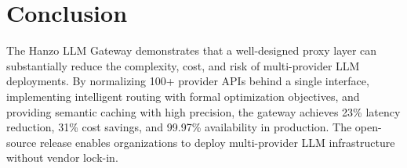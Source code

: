 \section{Conclusion}

\label{sec:conclusion}

The Hanzo LLM Gateway demonstrates that a well-designed proxy layer can substantially reduce the complexity, cost, and risk of multi-provider LLM deployments. By normalizing 100+ provider APIs behind a single interface, implementing intelligent routing with formal optimization objectives, and providing semantic caching with high precision, the gateway achieves 23\% latency reduction, 31\% cost savings, and 99.97\% availability in production. The open-source release enables organizations to deploy multi-provider LLM infrastructure without vendor lock-in.

